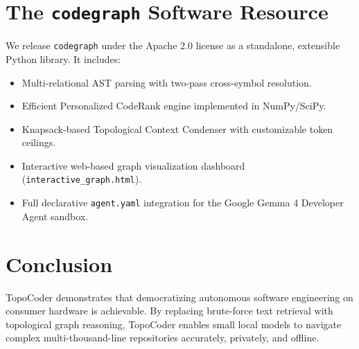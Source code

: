 \documentclass[11pt,a4paper]{article}
\begin{document}
\section{The \texttt{codegraph} Software Resource}
We release \texttt{codegraph} under the Apache 2.0 license as a standalone, extensible Python library. It includes:
\begin{itemize}
    \item Multi-relational AST parsing with two-pass cross-symbol resolution.
    \item Efficient Personalized CodeRank engine implemented in NumPy/SciPy.
    \item Knapsack-based Topological Context Condenser with customizable token ceilings.
    \item Interactive web-based graph visualization dashboard (\texttt{interactive\_graph.html}).
    \item Full declarative \texttt{agent.yaml} integration for the Google Gemma 4 Developer Agent sandbox.
\end{itemize}

\section{Conclusion}
TopoCoder demonstrates that democratizing autonomous software engineering on consumer hardware is achievable. By replacing brute-force text retrieval with topological graph reasoning, TopoCoder enables small local models to navigate complex multi-thousand-line repositories accurately, privately, and offline.



\end{document}
